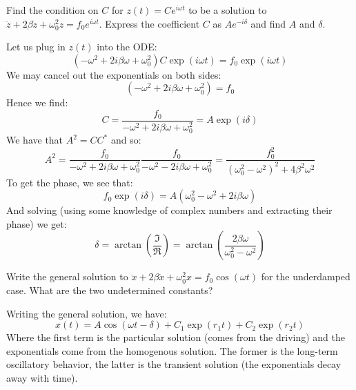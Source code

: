 \begin{p}
Find the condition on $C$ for $z(t) = Ce^{i\omega t}$ to be a solution to $\ddot{z} + 2\beta\dot{z} + \omega_0^2z = f_0e^{i\omega t}$. Express the coefficient $C$ as $Ae^{-i\delta}$ and find $A$ and $\delta$.
\end{p}
\begin{s}
Let us plug in $z(t)$ into the ODE:
\[(-\omega^2 + 2i\beta\omega + \omega_0^2)C\exp(i\omega t) = f_0\exp(i\omega t)\]
We may cancel out the exponentials on both sides:
\[(-\omega^2 + 2i\beta\omega + \omega_0^2) =f_0\]
Hence we find:
\[C = \frac{f_0}{-\omega^2 + 2i\beta\omega + \omega_0^2} = A\exp(i\delta)\]
We have that $A^2 = CC^*$ and so:
\[A^2 = \frac{f_0}{-\omega^2 + 2i\beta\omega + \omega_0^2}\frac{f_0}{-\omega^2 - 2i\beta\omega + \omega_0^2} = \frac{f_0^2}{(\omega_0^2 - \omega^2)^2 + 4\beta^2\omega^2}\]
To get the phase, we see that:
\[f_0\exp(i\delta) = A(\omega_0^2 - \omega^2 + 2i\beta\omega)\]
And solving (using some knowledge of complex numbers and extracting their phase) we get:
\[\delta = \arctan(\frac{\Im}{\Re}) = \arctan(\frac{2\beta \omega}{\omega_0^2 - \omega^2})\]
\end{s}

\begin{p}
Write the general solution to $\ddot{x} + 2\beta\dot{x} + \omega_0^2x = f_0\cos(\omega t)$ for the underdamped case. What are the two undetermined constants?
\end{p}
\begin{s}
Writing the general solution, we have:
\[x(t) = A\cos(\omega t -\delta) + C_1\exp(r_1 t) + C_2\exp(r_2 t)\]
Where the first term is the particular solution (comes from the driving) and the exponentials come from the homogenous solution. The former is the long-term oscillatory behavior, the latter is the transient solution (the exponentials decay away with time).
\end{s}

